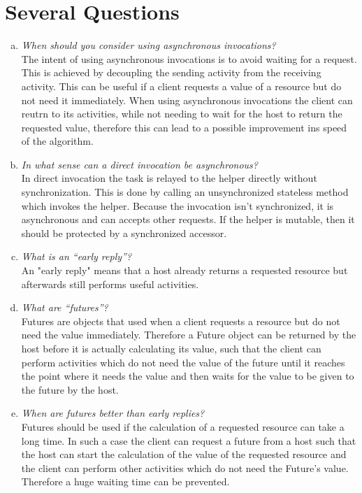 \documentclass{report}
\author{Marcel \textsc{Zauder} 16-124-836 \\
	Pascal \textsc{Gerig} 16-104-721}
\begin{document}
	\section{Several Questions}
	\startsection
		\begin{enumerate}[a)]
			\item \textit{When should you consider using asynchronous invocations?} \\
			The intent of using asynchronous invocations is to avoid waiting for a request. This is achieved by decoupling the sending activity from the receiving activity. This can be useful if a client requests a value of a resource but do not need it immediately. When using asynchronous invocations the client can reutrn to its activities, while not needing to wait for the host to return the requested value, therefore this can lead to a possible improvement ins speed of the algorithm.
			\item \textit{In what sense can a direct invocation be asynchronous?} \\
			In direct invocation the task is relayed to the helper directly without synchronization. This is done by calling an unsynchronized stateless method which invokes the helper. Because the invocation isn’t synchronized, it is asynchronous and can accepts other requests. If the helper is mutable, then it should be protected by a synchronized accessor.
			\item \textit{What is an “early reply”?} \\
			An "early reply" means that a host already returns a requested resource but afterwards still performs useful activities.
			\item \textit{What are “futures”?} \\
			Futures are objects that used when a client requests a resource but do not need the value immediately. Therefore a Future object can be returned by the host before it is actually calculating its value, such that the client can perform activities which do not need the value of the future until it reaches the point where it needs the value and then waits for the value to be given to the future by the host.
			\item \textit{When are futures better than early replies?} \\
			Futures should be used if the calculation of a requested resource can take a long time. In such a case the client can request a future from a host such that the host can start the calculation of the value of the requested resource and the client can perform other activities which do not need the Future's value. Therefore a huge waiting time can be prevented.
		\end{enumerate}
	\closesection
	
\end{document}
